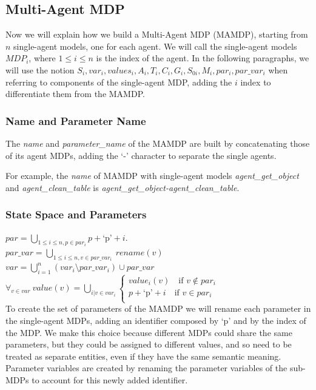 \subsection{Multi-Agent MDP}
Now we will explain how we build a Multi-Agent MDP (MAMDP), starting from $n$ single-agent models, one for each agent. We will call the single-agent models $MDP_i$, where $1 \leq i \leq n $ is the index of the agent. In the following paragraphs, we will use the notion $S_i, var_i, values_i, A_i, T_i, C_i, G_i, S_{0i}, M_i, par_i, par\_var_i$ when referring to components of the single-agent MDP, adding the $i$ index to differentiate them from the MAMDP. 
 
\subsubsection{Name and Parameter Name}
The \textit{name} and \textit{parameter\_name} of the MAMDP are built by concatenating those of its agent MDPs, adding the `-' character to separate the single agents.

For example, the \textit{name} of MAMDP with single-agent models \textit{agent\_get\_object} and  \textit{agent\_clean\_table} is \textit{agent\_get\_object-agent\_clean\_table}.

\subsubsection{State Space and Parameters}
$par=\bigcup_{1 \leq i \leq n, p \in par_i} p+\text{`p'}+i $. \\
$par\_var=\bigcup_{1 \leq i \leq n, v \in par\_var_i} \> rename(v)$ \\
$var=\bigcup_{i=1}^{n}(var_i \setminus par\_var_i) \cup par\_var$ \\
$\forall_{v \in var}\> value(v)=\bigcup_{i| v \in var_i} 
\begin{cases}
	 value_i(v) \quad \text{if } v \not \in par_i \\
	 p+\text{`p'}+i \quad \text{if } v \in par_i \\
\end{cases}$ \\ 

To create the set of parameters of the MAMDP we will rename each parameter in the single-agent MDPs, adding an identifier composed by `p' and by the index of the MDP. We make this choice because different MDPs could share the same parameters, but they could be assigned to different values, and so need to be treated as separate entities, even if they have the same semantic meaning. Parameter variables are created by renaming the parameter variables of the sub-MDPs to account for this newly added identifier.

